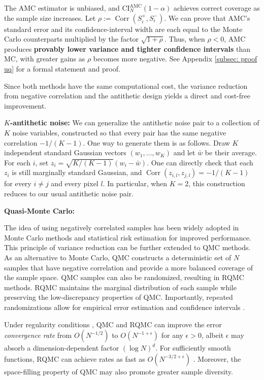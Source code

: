 \documentclass[12pt]{article}
\newcommand{\0}{\mathbf{0}}
\newcommand{\CI}{\text{CI}}
\newcommand{\AMC}{\text{AMC}}
\DeclareMathOperator{\Corr}{Corr}
\begin{document}
The AMC estimator is unbiased, and $\CI_N^\AMC(1-\alpha)$ achieves correct coverage as the sample size increases. Let $\rho := \Corr(S_i^+, S_i^-)$. We can prove that AMC’s standard error and its confidence-interval width are each equal to the Monte Carlo counterparts multiplied by the factor $\sqrt{1+\rho}$. Thus, when $\rho < 0$, AMC produces \textbf{provably lower variance and tighter confidence intervals} than MC, with greater gains as $\rho$ becomes more negative. See Appendix \ref{subsec: proof uq} for a formal statement and proof.

Since both methods have the same computational cost, the variance reduction from negative correlation and the antithetic design yields a direct and cost-free improvement.


\textbf{$K$-antithetic noise:} We can generalize the antithetic noise pair to a collection of $K$ noise variables, constructed so that every pair has the same negative correlation $-1/(K-1)$. One way to generate them is as follows. Draw $K$ independent standard Gaussian vectors $(w_1,\ldots,w_K)$ and let $\bar w$ be their average. For each $i$, set
$
z_i = \sqrt{K/(K-1)}\left(w_i - \bar w\right).
$
One can directly check that each $z_i$ is still marginally standard Gaussian, and $\Corr(z_{i,l}, z_{j,l}) = -1/(K-1) $ for every $i\neq j$ and every pixel $l$. In particular, when 
$K=2$, this construction reduces to our usual antithetic noise pair.



\textbf{Quasi-Monte Carlo:}

The idea of using negatively correlated samples has been widely adopted in Monte Carlo methods \citep{craiu2005multiprocess} and statistical risk estimation \citep{liu2024crossvalidation} for improved performance. 
This principle of variance reduction can be further extended to QMC methods. As an alternative to Monte Carlo, QMC constructs a deterministic set of $N$ samples that have negative correlation and provide a more balanced coverage of the sample space. QMC samples can also be randomized, resulting in RQMC methods. RQMC maintains the marginal distribution of each sample while preserving the low-discrepancy properties of QMC. Importantly, repeated randomizations allow for empirical error estimation and confidence intervals \citep{lecuyer2023confidence}.


Under regularity conditions \citep{nied:1992}, QMC and RQMC can improve the error \textit{convergence rate} from $O(N^{-1/2})$ to $O(N^{-1+\epsilon})$ for any $\epsilon>0$, albeit $\epsilon$ may absorb a dimension-dependent factor $(\log N)^{d}$. For sufficiently smooth functions, RQMC can achieve rates as fast as $O(N^{-3/2+\epsilon})$ \citep{snetvar,smoovar}.
Moreover, the space-filling property of QMC may also promote greater sample diversity.
\end{document}
